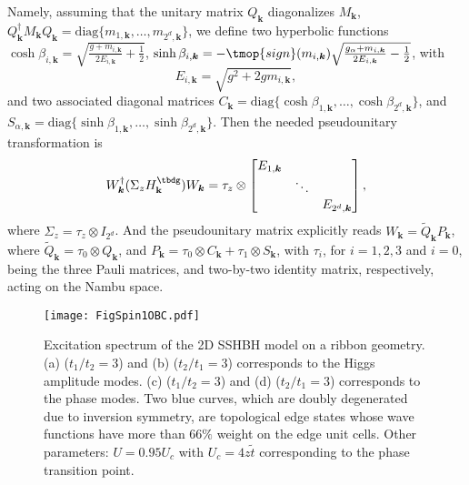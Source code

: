 Namely,
assuming that the unitary matrix $Q_{\bm{k}}$ diagonalizes $M_{\bm{k}}$,
$Q_{\bm{k}}^{\dag} M_{\bm{k}} Q_{\bm{k}} = \text{diag} \{m_{1, \bm{k}}, \ldots, m_{2^d, \bm{k}} \}$,
we define two hyperbolic functions $\cosh\beta_{i, \bm{k}} = \sqrt{\frac{g + m_{i, \bm{k}}}{2 E_{i,\bm{k}}} + \frac{1}{2}}$,
$\sinh \beta_{i, \bm{k}} = - \tmop{sign}(m_{i, \bm{k}}) \sqrt{\frac{g_{\alpha} + m_{i, \bm{k}}}{2 E_{i,\bm{k}}} - \frac{1}{2}}$,
with
\begin{equation}
  E_{i, \bm{k}} = \sqrt{g^2 + 2 g m_{i, \bm{k}}}, \label{eb}
\end{equation}
and two associated diagonal matrices $C_{\bm{k}} = \text{diag} \{ \cosh \beta_{1, \bm{k}}, \ldots, \cosh \beta_{2^d,\bm{k}} \}$,
and $S_{\alpha, \bm{k}} = \text{diag} \{ \sinh \beta_{1,\bm{k}}, \ldots, \sinh \beta_{2^d, \bm{k}} \}$.
Then the needed pseudounitary transformation is
\begin{equation}
  W_{\bm{k}}^{\dag} (\Sigma_z H^\tbdg_{\vb k}) W_{\bm{k}}  = \tau_z \otimes \begin{bmatrix}
      E_{1, \bm{k}} & & \\
      & \ddots & \\
      & & E_{2^d,\bm{k}}
  \end{bmatrix},\label{put}
\end{equation}
where $\Sigma_z=\tau_z\otimes I_{2^d}$. And the pseudounitary matrix explicitly reads $W_{\bm{k}} = \tilde Q_{\bm{k}} P_{\bm{k}}$,
where $\tilde Q_{\bm{k}}=\tau_0 \otimes Q_{\bm{k}}$,
and $P_{\bm{k}} = \tau_0 \otimes C_{\bm{k}} + \tau_1 \otimes S_{\bm{k}}$,
with $\tau_i$,
for $i=1,2,3$ and $i=0$,
being the three Pauli matrices,
and two-by-two identity matrix,
respectively, acting on the Nambu space.

\begin{figure}[t]
    \texttt{[image: FigSpin1OBC.pdf]}
    \caption{\label{spin1OBC} Excitation spectrum of the 2D SSHBH model on a ribbon geometry.
    (a) ($t_1/t_2=3$) and (b) ($t_2/t_1=3$) corresponds to the Higgs amplitude modes.
    (c) ($t_1/t_2=3$) and (d) ($t_2/t_1=3$) corresponds to the phase modes.
    Two blue curves,
    which are doubly degenerated due to inversion symmetry,
    are topological edge states whose wave functions have more than $66\%$ weight on the edge unit cells.
    Other parameters:
    $U=0.95 U_c$ with $U_c=4z \tilde t$ corresponding to the phase transition point.}
\end{figure}

